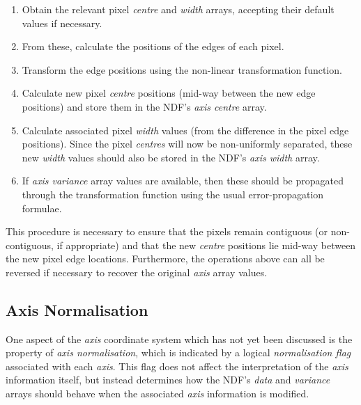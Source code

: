 \documentclass[twoside,11pt]{article}
\newcommand{\xlabel}[1]{}
\newcommand{\st}[1]{{\em{#1}}}
\begin{document}
\begin{enumerate}

\item Obtain the relevant pixel \st{centre\/} and \st{width\/} arrays,
accepting their default values if necessary. 

\item From these, calculate the positions of the edges of each pixel.

\item Transform the edge positions using the non-linear transformation 
function.

\item Calculate new pixel \st{centre\/} positions (mid-way between the new
edge positions) and store them in the NDF's \st{axis centre\/} array. 

\item Calculate associated pixel \st{width\/} values (from the difference
in the pixel edge positions). 
Since the pixel \st{centres\/} will now be non-uniformly separated, these
new \st{width\/} values should also be stored in the NDF's \st{axis
width\/} array. 

\item If \st{axis variance\/} array values are available, then these should
be propagated through the transformation function using the usual
error-propagation formulae. 

\end{enumerate}

This procedure is necessary to ensure that the pixels remain contiguous 
(or non-contiguous, if appropriate) and that the new \st{centre\/}
positions lie mid-way between the new pixel edge locations. 
Furthermore, the operations above can all be reversed if necessary to
recover the original \st{axis\/} array values. 

\subsection{\xlabel{axis_normalisation}\label{ss:axisnormalisation}Axis Normalisation}

One aspect of the \st{axis\/} coordinate system which has not yet been
discussed is the property of \st{axis normalisation}, which is indicated by
a logical \st{normalisation flag\/} associated with each \st{axis}. 
This flag does not affect the interpretation of the \st{axis\/} information
itself, but instead determines how the NDF's \st{data\/} and
\st{variance\/} arrays should behave when the associated \st{axis\/} 
information is modified. 
\end{document}
